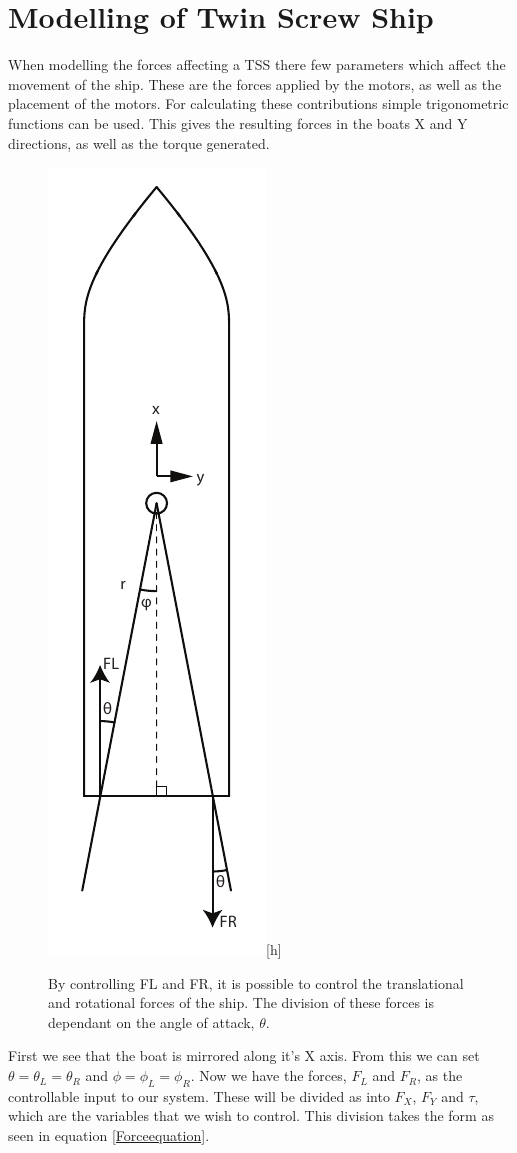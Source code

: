 \chapter{Modelling of Twin Screw Ship}
When modelling the forces affecting a \ac{TSS} there few parameters which affect the movement of the ship. These are the forces applied by the motors, as well as the placement of the motors. For calculating these contributions simple trigonometric functions can be used. This gives the resulting forces in the boats X and Y directions, as well as the torque generated.
\begin{figure}
\includegraphics{img/boatmodel.pdf}[h]
\caption{By controlling FL and FR, it is possible to control the translational and rotational forces of the ship. The division of these forces is dependant on the angle of attack, $\theta$.}
\end{figure}
First we see that the boat is mirrored along it's X axis. From this we can set $\theta = \theta_L = \theta_R$ and $\phi = \phi_L = \phi_R$.  Now we have the forces, $F_L$ and $F_R$, as the controllable input to our system. These will be divided as into $F_X$, $F_Y$ and $\tau$, which are the variables that we wish to control. This division takes the form as seen in equation \eqref{Forceequation}.

